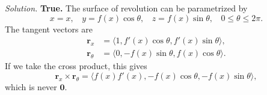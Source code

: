 \documentclass{article}
\newcommand{\rr}{\mathbf{r}}
\begin{document}
\begin{enumerate}
{\em Solution.} {\bf True.} The surface of revolution can be parametrized by
\[
x = x, ~~~~ y = f(x) \cos \theta, ~~~~ z = f(x) \sin \theta, ~~~~ 0 \le \theta \le 2\pi.
\]
The tangent vectors are
\begin{align*}
\rr_x & = \langle 1, f'(x) \cos \theta, f'(x) \sin \theta \rangle, \\
\rr_\theta & = \langle 0, -f(x) \sin \theta, f(x) \cos \theta \rangle.
\end{align*}
If we take the cross product, this gives
\[
\rr_x \times \rr_\theta = \langle f(x) f'(x), -f(x) \cos \theta, -f(x) \sin \theta \rangle,
\]
which is never $\mathbf{0}$.
\end{enumerate}
\end{document}
